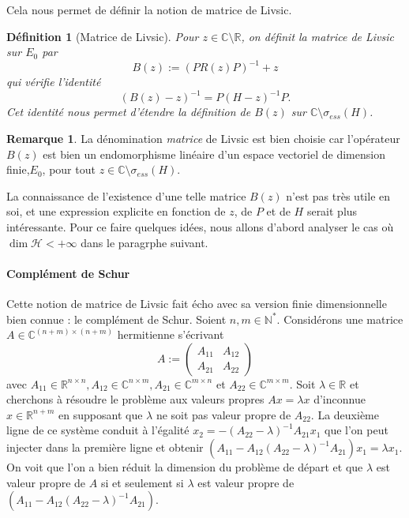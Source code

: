 \documentclass[12pt,openany,a4paper, titlepage]{article}
\newcommand{\R}{\mathbb{R}}
\newcommand{\C}{\mathbb{C}}
\newcommand{\N}{\mathbb{N}}
\newcommand{\HH}{\mathcal{H}}
\newcommand{\inv}{^{-1}}
\newtheorem{Def}{Définition}
\theoremstyle{definition}
\theoremstyle{definition}
\theoremstyle{definition}
\theoremstyle{definition}
\theoremstyle{definition}
\newtheorem{rem}{Remarque}
\theoremstyle{definition}
\begin{document}
Cela nous permet de définir la notion de matrice de Livsic.

\begin{Def}[Matrice de Livsic]
Pour $z\in \C\setminus\R$, on définit la matrice de Livsic sur $E_0$ par
\begin{equation*}
    B(z) := (PR(z)P)\inv + z
\end{equation*}
qui vérifie l'identité 
\begin{equation*}
    (B(z)-z)\inv = P(H-z)\inv P.
\end{equation*}
Cet identité nous permet d'étendre la définition de $B(z)$ sur $\C\setminus\sigma_{ess}(H)$.
\end{Def}

\begin{rem}
    La dénomination \textit{matrice} de Livsic est bien choisie car l'opérateur $B(z)$ est bien un endomorphisme linéaire d'un espace vectoriel de dimension finie,$E_0$, pour tout $z\in\C\setminus\sigma_{ess}(H)$.
\end{rem}

La connaissance de l'existence d'une telle matrice $B(z)$ n'est pas très utile en soi, et une expression explicite en fonction de $z$, de $P$ et de $H$ serait plus intéressante. Pour ce faire quelques idées, nous allons d'abord analyser le cas où $\dim \HH < +\infty$ dans le paragrphe suivant. 

\paragraph{Complément de Schur}
Cette notion de matrice de Livsic fait écho avec sa version finie dimensionnelle bien connue : le complément de Schur.  
Soient $n,m \in\N^*$. Considérons une matrice $A\in\C^{(n+m)\times (n+m)}$ hermitienne s'écrivant 
\begin{equation*}
    A:= \begin{pmatrix}
A_{11} & A_{12} \\
A_{21} & A_{22} 
\end{pmatrix}
\end{equation*}
avec $A_{11}\in\R^{n\times n},  A_{12}\in\C^{n\times m}, A_{21}\in\C^{m\times n}$ et $A_{22}\in\C^{m\times m}$. Soit $\lambda \in \R$ et cherchons à résoudre le problème aux valeurs propres $Ax = \lambda x$ d'inconnue $x\in\R^{n+m}$ en supposant que $\lambda$ ne soit pas valeur propre de $A_{22}$. La deuxième ligne de ce système conduit à l'égalité $x_2 = -(A_{22}-\lambda)^{-1}A_{21}x_1$ que l'on peut injecter dans la première ligne et obtenir $(A_{11} - A_{12}(A_{22}-\lambda)^{-1}A_{21})x_1 = \lambda x_1 $. On voit que l'on a bien réduit la dimension du problème de départ et que $\lambda$ est valeur propre de $A$ si et seulement si $\lambda$ est valeur propre de $(A_{11} - A_{12}(A_{22}-\lambda)^{-1}A_{21})$.\\
\end{document}
